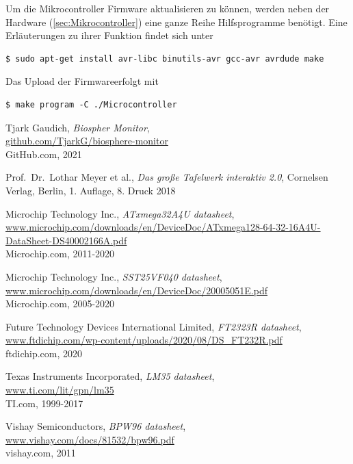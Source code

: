 \documentclass[12pt, a4paper, oneside]{report}
\begin{document}
Um die Mikrocontroller Firmware aktualisieren zu können, werden neben der Hardware (\autoref{sec:Mikrocontroller})  eine ganze Reihe Hilfsprogramme benötigt. Eine Erläuterungen zu ihrer Funktion findet sich unter \cite{UbuntuAVR}
\begin{lstlisting}
$ sudo apt-get install avr-libc binutils-avr gcc-avr avrdude make
\end{lstlisting}
Das Upload der Firmwareerfolgt mit
\begin{lstlisting}
$ make program -C ./Microcontroller
\end{lstlisting}

\begin{thebibliography}{9}
\raggedright 

  Tjark Gaudich,
  \textit{Biospher Monitor},\\
  \url{github.com/TjarkG/biosphere-monitor}\\
  GitHub.com,
  2021
  
  Prof.~Dr.~Lothar Meyer et al.,
  \textit{Das große Tafelwerk interaktiv 2.0},
  Cornelsen Verlag, Berlin,
  1. Auflage, 8. Druck 2018
  
  Microchip Technology Inc.,
  \textit{ATxmega32A4U datasheet},\\
  \url{www.microchip.com/downloads/en/DeviceDoc/ATxmega128-64-32-16A4U-DataSheet-DS40002166A.pdf}\\
  Microchip.com,
  2011-2020
  
  Microchip Technology Inc.,
  \textit{SST25VF040 datasheet},\\
  \url{www.microchip.com/downloads/en/DeviceDoc/20005051E.pdf}\\
  Microchip.com,
  2005-2020
  
  Future Technology Devices International Limited,
  \textit{FT2323R datasheet},\\
  \url{www.ftdichip.com/wp-content/uploads/2020/08/DS_FT232R.pdf}\\
  ftdichip.com, 2020
  
  Texas Instruments Incorporated,
  \textit{LM35 datasheet},\\
  \url{www.ti.com/lit/gpn/lm35}\\
  TI.com,
  1999-2017
  
  Vishay Semiconductors,
  \textit{BPW96 datasheet},\\
  \url{www.vishay.com/docs/81532/bpw96.pdf}\\
  vishay.com,
  2011
  

\end{thebibliography}
\end{document}
